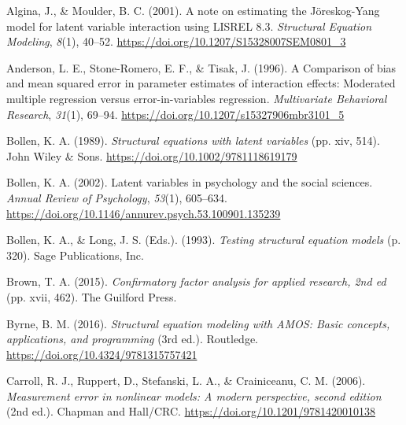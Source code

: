 \documentclass[
  man]{apa6}
\newlength{\cslhangindent}
\newlength{\cslentryspacingunit} %
\newenvironment{CSLReferences}[2] %
 {%
  \setlength{\parindent}{0pt}
  \ifodd #1
  \let\oldpar\par
  \def\par{\hangindent=\cslhangindent\oldpar}
  \fi
  \setlength{\parskip}{#2\cslentryspacingunit}
 }%
 {}
\begin{document}
\hypertarget{refs}{}
\begin{CSLReferences}{1}{0}
\leavevmode{}%
Algina, J., \& Moulder, B. C. (2001). A note on estimating the {J{ö}reskog-Yang} model for latent variable interaction using {LISREL} 8.3. \emph{Structural Equation Modeling}, \emph{8}(1), 40--52. \url{https://doi.org/10.1207/S15328007SEM0801_3}

\leavevmode{}%
Anderson, L. E., Stone-Romero, E. F., \& Tisak, J. (1996). A {Comparison} of bias and mean squared error in parameter estimates of interaction effects: {Moderated} multiple regression versus error-in-variables regression. \emph{Multivariate Behavioral Research}, \emph{31}(1), 69--94. \url{https://doi.org/10.1207/s15327906mbr3101_5}

\leavevmode{}%
Bollen, K. A. (1989). \emph{Structural equations with latent variables} (pp. xiv, 514). John Wiley \& Sons. \url{https://doi.org/10.1002/9781118619179}

\leavevmode{}%
Bollen, K. A. (2002). Latent variables in psychology and the social sciences. \emph{Annual Review of Psychology}, \emph{53}(1), 605--634. \url{https://doi.org/10.1146/annurev.psych.53.100901.135239}

\leavevmode{}%
Bollen, K. A., \& Long, J. S. (Eds.). (1993). \emph{Testing structural equation models} (p. 320). Sage Publications, Inc.

\leavevmode{}%
Brown, T. A. (2015). \emph{Confirmatory factor analysis for applied research, 2nd ed} (pp. xvii, 462). The Guilford Press.

\leavevmode{}%
Byrne, B. M. (2016). \emph{Structural equation modeling with {AMOS}: {Basic} concepts, applications, and programming} (3rd ed.). Routledge. \url{https://doi.org/10.4324/9781315757421}

\leavevmode{}%
Carroll, R. J., Ruppert, D., Stefanski, L. A., \& Crainiceanu, C. M. (2006). \emph{Measurement error in nonlinear models: {A} modern perspective, second edition} (2nd ed.). {Chapman and Hall/CRC}. \url{https://doi.org/10.1201/9781420010138}


\end{CSLReferences}
\end{document}
